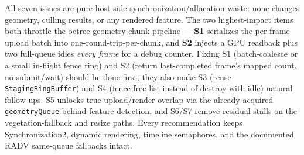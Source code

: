 \documentclass[a4paper,12pt]{article}
\begin{document}
All seven issues are pure host-side synchronization/allocation waste: none
changes geometry, culling results, or any rendered feature. The two
highest-impact items both throttle the octree geometry-chunk pipeline —
\textbf{S1} serializes the per-frame upload batch into one-round-trip-per-chunk,
and \textbf{S2} injects a GPU readback plus two full-queue idles \emph{every
frame} for a debug counter. Fixing S1 (batch-coalesce or a small in-flight
fence ring) and S2 (return last-completed frame's mapped count, no submit/wait)
should be done first; they also make S3 (reuse \texttt{StagingRingBuffer}) and
S4 (fence free-list instead of destroy-with-idle) natural follow-ups. S5 unlocks
true upload/render overlap via the already-acquired \texttt{geometryQueue} behind
feature detection, and S6/S7 remove residual stalls on the vegetation-fallback
and resize paths. Every recommendation keeps Synchronization2, dynamic
rendering, timeline semaphores, and the documented RADV same-queue fallbacks
intact.
\end{document}
